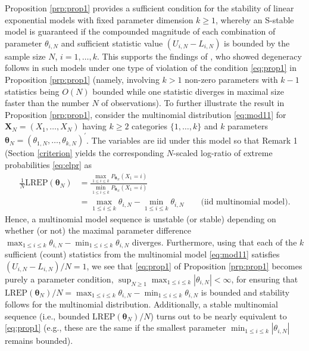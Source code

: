 \documentclass[numbib]{imamat}
\theoremstyle{theorem}
\theoremstyle{lemma}
\theoremstyle{example}
\theoremstyle{corollary}
\theoremstyle{definition}
\theoremstyle{remark}
\theoremstyle{approximation}
\theoremstyle{scheme}
\newcommand{\REP}{\mathrm{LREP}}
\begin{document}
Proposition \ref{prp:prop1} provides a sufficient condition for the
stability of linear exponential models with fixed parameter dimension
\(k\geq 1\), whereby an S-stable model is guaranteed if the compounded
magnitude of each combination of parameter \(\theta_{i,N}\) and
sufficient statistic value \((U_{i,N}-L_{i,N})\) is bounded by the
sample size \(N\), \(i=1,\ldots,k\). This supports the findings of
\citet{schweinberger2011instability}, who showed degeneracy follows in
such models under one type of violation of the condition \eqref{eq:prop1}
in Proposition \ref{prp:prop1} (namely, involving \(k>1\) non-zero
parameters with \(k-1\) statistics being \(O(N)\) bounded while one
statistic diverges in maximal size faster than the number \(N\) of
observations). To further illustrate the result in Proposition
\ref{prp:prop1}, consider the multinomial distribution \eqref{eq:mod11}
for \(\boldsymbol X_N=(X_1,\ldots,X_N)\) having \(k\geq 2\) categories
\(\{1,\ldots,k\}\) and \(k\) parameters
\(\boldsymbol \theta_N = (\theta_{1,N},\ldots,\theta_{k,N})^\prime\).
The variables are iid under this model so that Remark 1 (Section
\ref{criterion} yields the corresponding \(N\)-scaled log-ratio of
extreme probabilities \eqref{eq:elpr} as \begin{align*}
  \frac{1}{N}\REP(\boldsymbol \theta_N) &= \frac{\max_{1 \leq i \leq k} P_{\boldsymbol \theta_N}(X_1=i)}{\min_{1 \leq i \leq k} P_{\boldsymbol \theta_N}(X_1=i)}\\
  &= \max_{1 \leq i \leq k} \theta_{i,N} - \min_{1 \leq i \leq k} \theta_{i,N} \qquad \text{(iid multinomial model)}.
\end{align*} Hence, a multinomial model sequence is unstable (or stable)
depending on whether (or not) the maximal parameter difference
\(\max_{1 \leq i \leq k} \theta_{i,N} - \min_{1 \leq i \leq k} \theta_{i,N}\)
diverges. Furthermore, using that each of the \(k\) sufficient (count)
statistics from the multinomial model \eqref{eq:mod11} satisfies
\((U_{i,N}-L_{i,N})/N=1\), we see that \eqref{eq:prop1} of Proposition
\ref{prp:prop1} becomes purely a parameter condition,
\(\sup_{N \geq 1}\max_{1 \leq i \leq k } |\theta_{i,N}| <\infty\), for
ensuring that
\(\REP(\boldsymbol \theta_N)/N =\max_{1 \leq i \leq k} \theta_{i,N} - \min_{1 \leq i \leq k} \theta_{i,N}\)
is bounded and stability follows for the multinomial distribution.
Additionally, a stable multinomial sequence (i.e., bounded
\(\REP(\boldsymbol \theta_N)/N\)) turns out to be nearly equivalent to
\eqref{eq:prop1} (e.g., these are the same if the smallest parameter
\(\min_{1 \leq i \leq k } |\theta_{i,N}|\) remains bounded).
\end{document}
